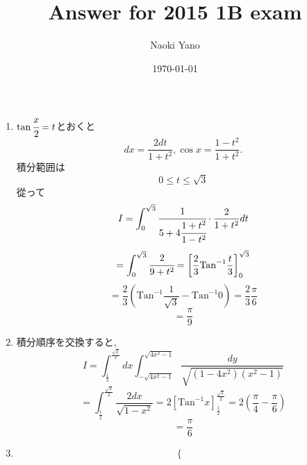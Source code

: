 \documentclass[a4paper,10pt,report]{amsart}
\title{Answer for 2015 1B exam}
\date{\today}
\author{Naoki Yano}
\begin{document}
    \maketitle
    \begin{enumerate}
        \item \(\tan\cfrac{x}{2}=t\)とおくと
        \begin{equation*}
            dx=\frac{2dt}{1+t^{2}},\cos{x}=\frac{1-t^{2}}{1+t^{2}}. 
        \end{equation*}
        積分範囲は
        \begin{equation*}
            0\leq t\leq\sqrt{3}
        \end{equation*}
        從って
        \begin{equation*}
            I=\int_{0}^{\sqrt{3}}\cfrac{1}{5+4\cfrac{1+t^{2}}{1-t^{2}}}\cdot\frac{2}{1+t^{2}}dt
        \end{equation*}
        \begin{equation*}
            =\int_{0}^{\sqrt{3}}\cfrac{2}{9+t^{2}}={\left[\frac{2}{3}\mathrm{Tan}^{-1}\frac{t}{3}\right]}_{0}^{\sqrt{3}}
        \end{equation*}
        \begin{equation*}
            =\frac{2}{3}\left(\mathrm{Tan}^{-1}\frac{1}{\sqrt{3}}-\mathrm{Tan}^{-1}0\right)=\frac{2}{3}\frac{\pi}{6}
        \end{equation*}
        \begin{equation*}
            =\frac{\pi}{9}
        \end{equation*}
        \item 積分順序を交換すると, 
        \begin{equation*}
            I=\int_{\frac{1}{2}}^{\frac{\sqrt{2}}{2}}dx\int_{-\sqrt{4x^{2}-1}}^{\sqrt{4x^{2}-1}}\frac{dy}{\sqrt{(1-4x^{2})(x^{2}-1)}}
        \end{equation*}
        \begin{equation*}
            =\int_{\frac{1}{2}}^{\frac{\sqrt{2}}{2}}\frac{2dx}{\sqrt{1-x^{2}}}=2{\left[\mathrm{Tan}^{-1}x\right]}_{\frac{1}{2}}^{\frac{\sqrt{2}}{2}}=2\left(\frac{\pi}{4}-\frac{\pi}{6}\right)
        \end{equation*}
        \begin{equation*}
            =\frac{\pi}{6}
        \end{equation*}
        \item 
        \begin{equation*}
            \begin{cases}

\end{cases}
\end{equation*}
\end{enumerate}
\end{document}
